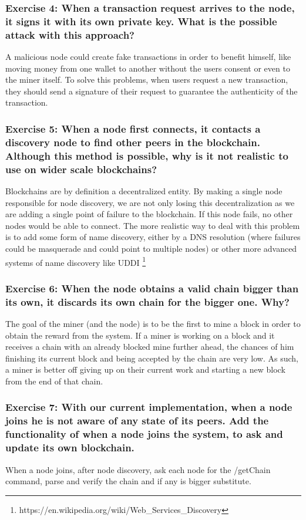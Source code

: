 \documentclass[12pt,a4paper]{article}
\begin{document}
\subsubsection*{Exercise 4: When a transaction request arrives to the node, it signs it with its own private key. What is the possible attack with this approach?}

A malicious node could create fake transactions in order to benefit himself, like moving money from one wallet to another without the users consent or even to the miner itself. To solve this problems, when users request a new transaction, they should send a signature of their request to guarantee the authenticity of the transaction.

\subsubsection*{Exercise 5: When a node first connects, it contacts a discovery node to find other peers in the blockchain. Although this method is possible, why is it not realistic to use on wider scale blockchains? }

Blockchains are by definition a decentralized entity. By making a single node responsible for node discovery, we are not only losing this decentralization as we are adding a single point of failure to the blockchain. If this node fails, no other nodes would be able to connect. The more realistic way to deal with this problem is to add some form of name discovery, either by a DNS resolution (where failures could be masquerade and could point to multiple nodes) or other more advanced systems of name discovery like UDDI \footnote{https://en.wikipedia.org/wiki/Web\_Services\_Discovery}

\subsubsection*{Exercise 6: When the node obtains a valid chain bigger than its own, it discards its own chain for the bigger one. Why? }

The goal of the miner (and the node) is to be the first to mine a block in order to obtain the reward from the system. If a miner is working on a block and it receives a chain with an already blocked mine further ahead, the chances of him finishing its current block and being accepted by the chain are very low. As such, a miner is better off giving up on their current work and starting a new block from the end of that chain.

\subsubsection*{Exercise 7: With our current implementation, when a node joins he is not aware of any state of its peers. Add the functionality of when a node joins the system, to ask and update its own blockchain.}

When a node joins, after node discovery, ask each node for the /getChain command, parse and verify the chain and if any is bigger substitute.




\end{document}
